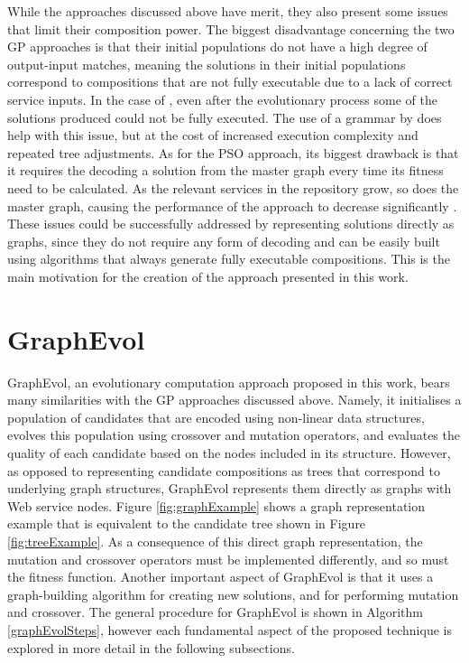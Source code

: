 \documentclass{article}
\begin{document}
While the approaches discussed above have merit, they also present some issues that limit their composition power. The biggest disadvantage concerning the two GP approaches is that their initial populations do not have a high degree of output-input matches, meaning the solutions in their initial populations correspond to compositions that are not fully executable due to a lack of correct service inputs. In the case of \cite{aversano2006genetic}, even after the evolutionary process some of the solutions produced could not be fully executed. The use of a grammar by \cite{rodriguez2010composition} does help with this issue, but at the cost of increased execution complexity and repeated tree adjustments. As for the PSO approach, its biggest drawback is that it requires the decoding a solution from the master graph every time its fitness need to be calculated. As the relevant services in the
repository grow, so does the master graph, causing the performance of the approach to decrease significantly \cite{silva2014graph}. These issues could be successfully addressed
by representing solutions directly as graphs, since they do not require any form of decoding and can be easily built using algorithms that always generate fully executable compositions. This is the main motivation for the creation of the approach presented in this work.

\section{GraphEvol}\label{graphevol}
GraphEvol, an evolutionary computation approach proposed in this work, bears many similarities with the GP approaches discussed above. Namely, it initialises a population 
of candidates that are encoded using non-linear data structures, evolves this population using crossover and mutation operators, and evaluates the quality of each candidate
based on the nodes included in its structure. However, as opposed to representing candidate compositions as trees that correspond to underlying graph structures, GraphEvol
represents them directly as graphs with Web service nodes. Figure \ref{fig:graphExample} shows a graph representation example that is equivalent to the candidate tree shown in Figure \ref{fig:treeExample}. As a consequence of this direct graph representation, the mutation and crossover operators must be implemented differently, and so must the fitness function. Another important aspect of GraphEvol is that it uses a graph-building algorithm for creating new  solutions, and for performing mutation and crossover. The general procedure for GraphEvol is shown in Algorithm \ref{graphEvolSteps}, however each fundamental aspect of the proposed technique is explored in more detail in the following subsections.
\end{document}
